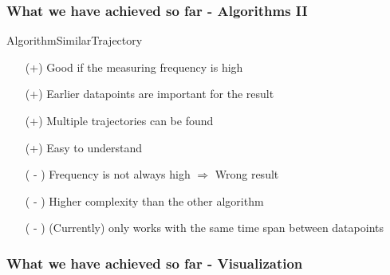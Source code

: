 \documentclass{beamer}
\begin{document}
\begin{frame}
	\frametitle{What we have achieved so far - Algorithms II}
	\Large{AlgorithmSimilarTrajectory}
	\normalsize{}
			\begin{itemize}
				\item[(+)] Good if the measuring frequency is high
				\item[(+)] Earlier datapoints are important for the result
				\item[(+)] Multiple trajectories can be found
				\item[(+)] Easy to understand
				\item[] 
				\item[( - )] Frequency is not always high $\Rightarrow$ Wrong result
				\item[( - )] Higher complexity than the other algorithm
				\item[( - )] (Currently) only works with the same time span between datapoints
			\end{itemize}
\end{frame}














\begin{frame}
	\frametitle{What we have achieved so far - Visualization}
    

    
\end{frame}
\end{document}
